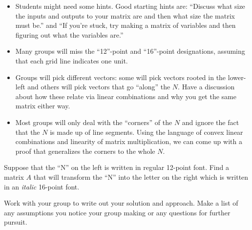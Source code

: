 \begin{iola}
	\begin{annotation}
		\begin{notes}
			\begin{itemize}
				\item Students might need some hints. Good starting hints are: ``Discuss
					what size the inputs and outputs to your matrix are and then what size
					the matrix must be.'' and ``If you're stuck, try making a matrix of variables
					and then figuring out what the variables are.''
				\item Many groups will miss the ``12''-point and ``16''-point designations, assuming that each
					grid line indicates one unit.
				\item Groups will pick different vectors: some will pick
					vectors rooted in the lower-left and others will pick vectors
					that go ``along'' the $N$. Have a discussion about how
					these relate via linear combinations and why you get the
					same matrix either way.
				\item Most groups will only deal with the ``corners'' of the $N$ and ignore
					the fact that the $N$ is made up of line segments. Using the language
					of convex linear combinations and linearity of matrix multiplication,
					we can come up with a proof that generalizes the corners to the whole $N$.
			\end{itemize}
		\end{notes}
	\end{annotation}

Suppose that the ``N'' on the left is written in regular 12-point font.  Find a matrix $A$ that will transform
	the ``N'' into the letter on the right which is written in an \emph{italic} 16-point font.

Work with your group to write out your solution and approach.  Make a list of any assumptions you
notice your group making or any questions for further pursuit.
\end{iola}



